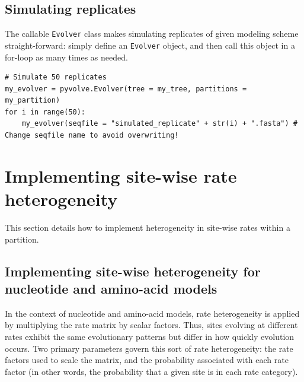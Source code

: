 \documentclass{article}
\newcommand{\code}[1]{\texttt{\small{#1}}}
\begin{document}


\subsection{Simulating replicates}

The callable \code{Evolver} class makes simulating replicates of given modeling scheme straight-forward: simply define an \code{Evolver} object, and then call this object in a for-loop as many times as needed.

\begin{lstlisting}
# Simulate 50 replicates
my_evolver = pyvolve.Evolver(tree = my_tree, partitions = my_partition)
for i in range(50):
	my_evolver(seqfile = "simulated_replicate" + str(i) + ".fasta") # Change seqfile name to avoid overwriting!
\end{lstlisting}


















\section{Implementing site-wise rate heterogeneity}\label{sec:sitehet}

This section details how to implement heterogeneity in site-wise rates within a partition.


\subsection{Implementing site-wise heterogeneity for nucleotide and amino-acid models}

In the context of nucleotide and amino-acid models, rate heterogeneity is applied by multiplying the rate matrix by scalar factors. Thus, sites evolving at different rates exhibit the same evolutionary patterns but differ in how quickly evolution occurs. Two primary parameters govern this sort of rate heterogeneity: the rate factors used to scale the matrix, and the probability associated with each rate factor (in other words, the probability that a given site is in each rate category).  
\end{document}
